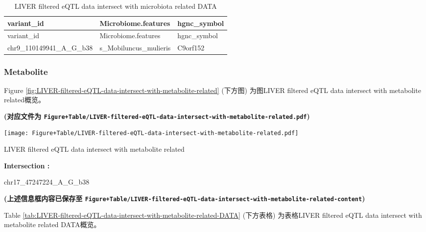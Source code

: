 \documentclass[
]{article}
\begin{document}
\begin{longtable}[]{@{}lll@{}}
\caption{\label{tab:LIVER-filtered-eQTL-data-intersect-with-microbiota-related-DATA}LIVER filtered eQTL data intersect with microbiota related DATA}\tabularnewline
\toprule
variant\_id & Microbiome.features & hgnc\_symbol\tabularnewline
\midrule
\endfirsthead
\toprule
variant\_id & Microbiome.features & hgnc\_symbol\tabularnewline
\midrule
\endhead
chr9\_110149941\_A\_G\_b38 & s\_Mobiluncus\_mulieris & C9orf152\tabularnewline
\bottomrule
\end{longtable}

\hypertarget{f-met}{%
\subsubsection{Metabolite}\label{f-met}}

Figure \ref{fig:LIVER-filtered-eQTL-data-intersect-with-metabolite-related} (下方图) 为图LIVER filtered eQTL data intersect with metabolite related概览。

\textbf{(对应文件为 \texttt{Figure+Table/LIVER-filtered-eQTL-data-intersect-with-metabolite-related.pdf})}

\def\@captype{figure}
\begin{center}
\texttt{[image: Figure+Table/LIVER-filtered-eQTL-data-intersect-with-metabolite-related.pdf]}
\caption{LIVER filtered eQTL data intersect with metabolite related}\label{fig:LIVER-filtered-eQTL-data-intersect-with-metabolite-related}
\end{center}
\begin{center}\begin{tcolorbox}[colback=gray!10, colframe=gray!50, width=0.9\linewidth, arc=1mm, boxrule=0.5pt]
\textbf{
Intersection
:}

\vspace{0.5em}

    chr17\_47247224\_A\_G\_b38

\vspace{2em}
\end{tcolorbox}
\end{center}

\textbf{(上述信息框内容已保存至 \texttt{Figure+Table/LIVER-filtered-eQTL-data-intersect-with-metabolite-related-content})}

Table \ref{tab:LIVER-filtered-eQTL-data-intersect-with-metabolite-related-DATA} (下方表格) 为表格LIVER filtered eQTL data intersect with metabolite related DATA概览。
\end{document}
